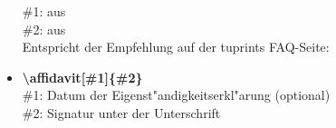 \documentclass[article,dr=phil,type=drfinal,colorback,accentcolor=tud9c]{tudthesis}
\begin{document}
\begin{itemize}
        \#1:  aus \\
        \#2:  aus \\
        Entspricht der Empfehlung auf der tuprints FAQ-Seite: 
      \item \textbf{\textbackslash affidavit[\#1]\{\#2\}}\\
        \#1: Datum der Eigenst"andigkeitserkl"arung (optional)\\
        \#2: Signatur unter der Unterschrift
    \end{itemize}
\end{document}
